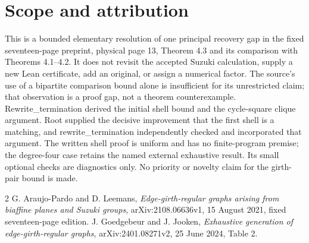 \documentclass[11pt,a4paper]{article}
\begin{document}
\section{Scope and attribution}
This is a bounded elementary resolution of one principal
recovery gap in the fixed seventeen-page preprint, physical page 13,
Theorem 4.3 and its comparison with Theorems 4.1--4.2. It does not
revisit the accepted Suzuki calculation, supply a new Lean certificate,
add an original, or assign a numerical factor. The source's use of a
bipartite comparison bound alone is insufficient for its unrestricted
claim; that observation is a proof gap, not a theorem counterexample.
Rewrite\_termination derived the initial shell bound and the cycle-square
clique argument. Root supplied the decisive improvement that the first shell
is a matching, and rewrite\_termination independently checked and incorporated
that argument. The written shell proof is uniform and has no finite-program
premise; the degree-four case retains the named external exhaustive result. Its small optional checks are diagnostics only. No priority or
novelty claim for the girth-pair bound is made.

\begin{thebibliography}{2}
 G. Araujo-Pardo and D. Leemans,
\emph{Edge-girth-regular graphs arising from biaffine planes and Suzuki
groups}, arXiv:2108.06636v1, 15 August 2021, fixed seventeen-page edition.
 J. Goedgebeur and J. Jooken,
\emph{Exhaustive generation of edge-girth-regular graphs},
arXiv:2401.08271v2, 25 June 2024, Table 2.
\end{thebibliography}
\end{document}
